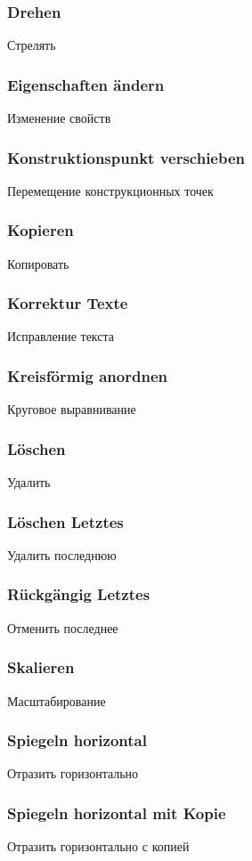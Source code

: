 \documentclass[14pt,a4paper]{book}
\begin{document}
			\subsubsection{Drehen}{Стрелять}
			\subsubsection{Eigenschaften ändern}{Изменение свойств}
			\subsubsection{Konstruktionspunkt verschieben}{Перемещение конструкционных
			точек}
			\subsubsection{Kopieren}{Копировать}
			\subsubsection{Korrektur Texte}{Исправление текста}
			\subsubsection{Kreisförmig anordnen}{Круговое выравнивание}
			\subsubsection{Löschen}{Удалить}
			\subsubsection{Löschen Letztes}{Удалить последнюю}
			\subsubsection{Rückgängig Letztes}{Отменить последнее}
			\subsubsection{Skalieren}{Масштабирование}
			\subsubsection{Spiegeln horizontal}{Отразить горизонтально}
			\subsubsection{Spiegeln horizontal mit Kopie}{Отразить горизонтально с
			копией}
\end{document}
